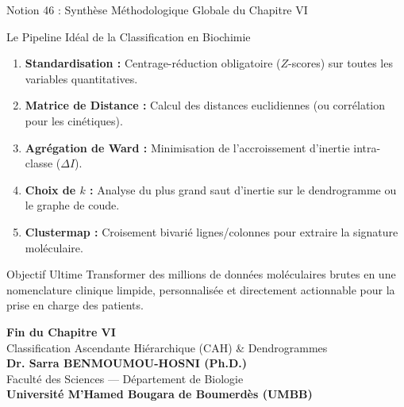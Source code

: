 \documentclass[aspectratio=169,10pt]{beamer}
\begin{document}
\begin{frame}{Notion 46 : Synthèse Méthodologique Globale du Chapitre VI}
  \begin{conceptbox}{Le Pipeline Idéal de la Classification en Biochimie}
    \footnotesize
    \begin{enumerate}
      \item \textbf{Standardisation :} Centrage-réduction obligatoire ($Z$-scores) sur toutes les variables quantitatives.
      \item \textbf{Matrice de Distance :} Calcul des distances euclidiennes (ou corrélation pour les cinétiques).
      \item \textbf{Agrégation de Ward :} Minimisation de l'accroissement d'inertie intra-classe ($\Delta I$).
      \item \textbf{Choix de $k$ :} Analyse du plus grand saut d'inertie sur le dendrogramme ou le graphe de coude.
      \item \textbf{Clustermap :} Croisement bivarié lignes/colonnes pour extraire la signature moléculaire.
    \end{enumerate}
  \end{conceptbox}
  \vspace{1mm}
  \begin{biobox}{Objectif Ultime}
    \footnotesize
    Transformer des millions de données moléculaires brutes en une nomenclature clinique limpide, personnalisée et directement actionnable pour la prise en charge des patients.
  \end{biobox}
\end{frame}

\begin{frame}[plain]
  \begin{center}
    \vspace{1.5cm}
    {\Huge\color{BioNavy}\textbf{Fin du Chapitre VI}}\\[0.6cm]
    {\large\color{BioDark}Classification Ascendante Hiérarchique (CAH) \& Dendrogrammes}\\[1.0cm]
    \textbf{Dr. Sarra BENMOUMOU-HOSNI (Ph.D.)}\\
    \small Faculté des Sciences --- Département de Biologie\\
    \textbf{Université M'Hamed Bougara de Boumerdès (UMBB)}
  \end{center}
\end{frame}
\end{document}
